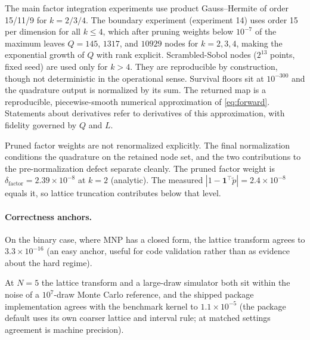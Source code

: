 \documentclass[12pt]{article}
\theoremstyle{remark}
\begin{document}
The main factor integration experiments use product
Gauss--Hermite of order 15/11/9 for $k = 2/3/4$. The boundary experiment
(experiment 14) uses order 15 per dimension for all $k \le 4$, which after
pruning weights below $10^{-7}$ of the maximum leaves $Q = 145$, $1317$, and
$10929$ nodes for $k = 2, 3, 4$, making the exponential growth of $Q$
with rank explicit. Scrambled-Sobol nodes ($2^{13}$ points, fixed seed)
are used only for $k > 4$. They are reproducible by construction, though
not deterministic in the operational sense. Survival floors sit at
$10^{-300}$ and the quadrature output is normalized by its sum. The
returned map is a reproducible, piecewise-smooth numerical approximation
of \eqref{eq:forward}. Statements about derivatives refer to
derivatives of this approximation, with fidelity governed by $Q$ and
$L$.

Pruned factor weights are not renormalized explicitly. The final
normalization conditions the quadrature on the retained node set, and the
two contributions to the pre-normalization defect separate cleanly. The
pruned factor weight is $\delta_{\mathrm{factor}} = 2.39\times10^{-8}$
at $k=2$ (analytic). The measured $|1 - \mathbf{1}^\top \tilde p| =
2.4\times10^{-8}$ equals it, so lattice truncation contributes below that
level.

\paragraph{Correctness anchors.} On the binary case, where MNP has a
closed form, the lattice transform agrees to $3.3\times10^{-16}$ (an easy
anchor, useful for code validation rather than as evidence about the hard
regime).

At $N=5$ the lattice transform and a large-draw simulator both sit
within the noise of a $10^7$-draw Monte Carlo reference, and the shipped
package implementation agrees with the benchmark kernel to
$1.1\times10^{-5}$ (the package default uses its own coarser lattice
and interval rule; at matched settings agreement is machine precision).
\end{document}
